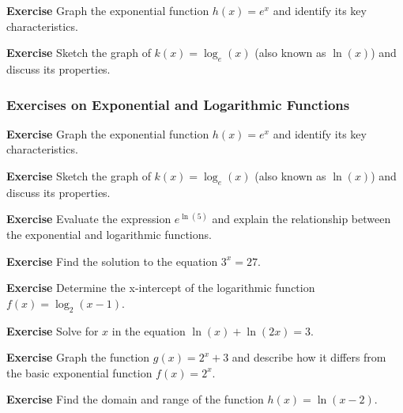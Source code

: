 \documentclass[a4paper,12pt]{book}
\newenvironment{exercise}[1][]
  {\par\medskip\noindent\textbf{Exercise #1} \rmfamily}
  {\medskip}
\begin{document}
\begin{exercise}
Graph the exponential function \( h(x) = e^x \) and identify its key characteristics.
\end{exercise}

\begin{exercise}
Sketch the graph of \( k(x) = \log_e(x) \) (also known as \( \ln(x) \)) and discuss its properties.
\end{exercise}

\subsubsection*{Exercises on Exponential and Logarithmic Functions}

\begin{exercise}
Graph the exponential function \( h(x) = e^x \) and identify its key characteristics.
\end{exercise}

\begin{exercise}
Sketch the graph of \( k(x) = \log_e(x) \) (also known as \( \ln(x) \)) and discuss its properties.
\end{exercise}

\begin{exercise}
Evaluate the expression \( e^{\ln(5)} \) and explain the relationship between the exponential and logarithmic functions.
\end{exercise}

\begin{exercise}
Find the solution to the equation \( 3^x = 27 \).
\end{exercise}

\begin{exercise}
Determine the x-intercept of the logarithmic function \( f(x) = \log_2(x - 1) \).
\end{exercise}

\begin{exercise}
Solve for \( x \) in the equation \( \ln(x) + \ln(2x) = 3 \).
\end{exercise}

\begin{exercise}
Graph the function \( g(x) = 2^x + 3 \) and describe how it differs from the basic exponential function \( f(x) = 2^x \).
\end{exercise}

\begin{exercise}
Find the domain and range of the function \( h(x) = \ln(x - 2) \).
\end{exercise}
\end{document}

